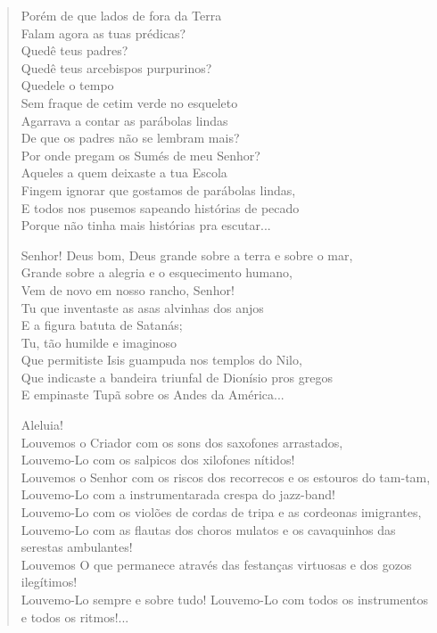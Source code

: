\begin{verse}
Porém de que lados de fora da Terra\\
Falam agora as tuas prédicas?\\
Quedê teus padres?\\
Quedê teus arcebispos purpurinos?\\
Quedele o tempo\\
Sem fraque de cetim verde no esqueleto\\
Agarrava a contar as parábolas lindas\\
De que os padres não se lembram mais?\\
Por onde pregam os Sumés de meu Senhor?\\
Aqueles a quem deixaste a tua Escola\\
Fingem ignorar que gostamos de parábolas lindas,\\
E todos nos pusemos sapeando histórias de pecado\\
Porque não tinha mais histórias pra escutar...

Senhor! Deus bom, Deus grande sobre a terra e sobre o mar,\\
Grande sobre a alegria e o esquecimento humano,\\
Vem de novo em nosso rancho, Senhor!\\
Tu que inventaste as asas alvinhas dos anjos\\
E a figura batuta de Satanás;\\
Tu, tão humilde e imaginoso\\
Que permitiste Isis guampuda nos templos do Nilo,\\
Que indicaste a bandeira triunfal de Dionísio pros gregos\\
E empinaste Tupã sobre os Andes da América...

Aleluia!\\
Louvemos o Criador com os sons dos saxofones arrastados,\\
Louvemo-Lo com os salpicos dos xilofones nítidos!\\
Louvemos o Senhor com os riscos dos recorrecos e os estouros do tam-tam,\\
Louvemo-Lo com a instrumentarada crespa do jazz-band!\\
Louvemo-Lo com os violões de cordas de tripa e as cordeonas imigrantes,\\
Louvemo-Lo com as flautas dos choros mulatos e os cavaquinhos das serestas ambulantes!\\
Louvemos O que permanece através das festanças virtuosas e dos gozos ilegítimos!\\
Louvemo-Lo sempre e sobre tudo! Louvemo-Lo com todos os instrumentos e todos os
ritmos!...


\end{verse}
